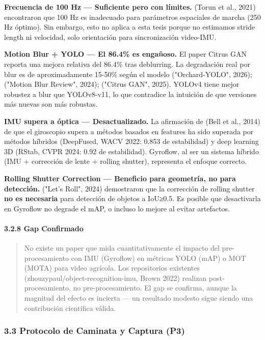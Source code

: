 \textbf{Frecuencia de 100 Hz — Suficiente pero con límites.} (Torun et al., 2021) encontraron que 100 Hz es inadecuado para parámetros espaciales de marcha (250 Hz óptimo). Sin embargo, esto no aplica a esta tesis porque no estimamos stride length ni velocidad, solo orientación para sincronización video-IMU.


\textbf{Motion Blur + YOLO — El 86.4\% es engañoso.} El paper Citrus GAN reporta una mejora relativa del 86.4\% tras deblurring. La degradación real por blur es de aproximadamente 15-50\% según el modelo ("Orchard-YOLO", 2026); ("Motion Blur Review", 2024); ("Citrus GAN", 2025). YOLOv4 tiene mejor robustez a blur que YOLOv8-v11, lo que contradice la intuición de que versiones más nuevas son más robustas.


\textbf{IMU supera a óptica — Desactualizado.} La afirmación de (Bell et al., 2014) de que el giroscopio supera a métodos basados en features ha sido superada por métodos híbridos (DeepFused, WACV 2022: 0.853 de estabilidad) y deep learning 3D (RStab, CVPR 2024: 0.92 de estabilidad). Gyroflow, al ser un sistema híbrido (IMU + corrección de lente + rolling shutter), representa el enfoque correcto.


\textbf{Rolling Shutter Correction — Beneficio para geometría, no para detección.} ("Let's Roll", 2024) demostraron que la corrección de rolling shutter \textbf{no es necesaria} para detección de objetos a IoU≥0.5. Es posible que desactivarla en Gyroflow no degrade el mAP, o incluso lo mejore al evitar artefactos.


\paragraph{3.2.8 Gap Confirmado}


\begin{quote}
No existe un paper que mida cuantitativamente el impacto del pre-procesamiento con IMU (Gyroflow) en métricas YOLO (mAP) o MOT (MOTA) para video agrícola. Los repositorios existentes (zhouzypaul/object-recognition-imu, Brown 2022) realizan post-procesamiento, no pre-procesamiento. El gap se confirma, aunque la magnitud del efecto es incierta — un resultado modesto sigue siendo una contribución científica válida.
\end{quote}


\subsubsection{3.3 Protocolo de Caminata y Captura (P3)}


